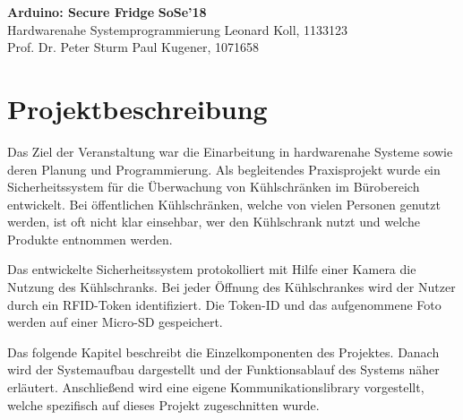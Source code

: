 \documentclass[a4paper, 11pt]{article}
\begin{document}
\noindent
\large\textbf{Arduino: Secure Fridge} \hfill \textbf{SoSe'18} \\
\normalsize Hardwarenahe Systemprogrammierung \hfill Leonard Koll, 1133123 \\
Prof. Dr. Peter Sturm \hfill Paul Kugener, 1071658

\section{Projektbeschreibung}
Das Ziel der Veranstaltung war die Einarbeitung in hardwarenahe Systeme sowie deren Planung und Programmierung. Als begleitendes Praxisprojekt wurde ein Sicherheitssystem für die Überwachung von Kühlschränken im Bürobereich entwickelt. Bei öffentlichen Kühlschränken, welche von vielen Personen genutzt werden, ist oft nicht klar einsehbar, wer den Kühlschrank nutzt und welche Produkte entnommen werden.

Das entwickelte Sicherheitssystem protokolliert mit Hilfe einer Kamera die Nutzung des Kühlschranks. Bei jeder Öffnung des Kühlschrankes wird der Nutzer durch ein RFID-Token identifiziert. Die Token-ID und das aufgenommene Foto werden auf einer Micro-SD gespeichert.

Das folgende Kapitel beschreibt die Einzelkomponenten des Projektes. Danach wird der Systemaufbau dargestellt und der Funktionsablauf des Systems näher erläutert. Anschließend wird eine eigene Kommunikationslibrary vorgestellt, welche spezifisch auf dieses Projekt zugeschnitten wurde.
\end{document}
